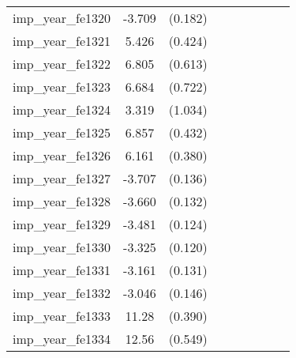 {\begin{tabular}{l*{4}{cc}}
imp\_year\_fe1320&   -3.709\sym{***}&  (0.182)&                  &         &                  &         &                  &         \\
imp\_year\_fe1321&    5.426\sym{***}&  (0.424)&                  &         &                  &         &                  &         \\
imp\_year\_fe1322&    6.805\sym{***}&  (0.613)&                  &         &                  &         &                  &         \\
imp\_year\_fe1323&    6.684\sym{***}&  (0.722)&                  &         &                  &         &                  &         \\
imp\_year\_fe1324&    3.319\sym{**} &  (1.034)&                  &         &                  &         &                  &         \\
imp\_year\_fe1325&    6.857\sym{***}&  (0.432)&                  &         &                  &         &                  &         \\
imp\_year\_fe1326&    6.161\sym{***}&  (0.380)&                  &         &                  &         &                  &         \\
imp\_year\_fe1327&   -3.707\sym{***}&  (0.136)&                  &         &                  &         &                  &         \\
imp\_year\_fe1328&   -3.660\sym{***}&  (0.132)&                  &         &                  &         &                  &         \\
imp\_year\_fe1329&   -3.481\sym{***}&  (0.124)&                  &         &                  &         &                  &         \\
imp\_year\_fe1330&   -3.325\sym{***}&  (0.120)&                  &         &                  &         &                  &         \\
imp\_year\_fe1331&   -3.161\sym{***}&  (0.131)&                  &         &                  &         &                  &         \\
imp\_year\_fe1332&   -3.046\sym{***}&  (0.146)&                  &         &                  &         &                  &         \\
imp\_year\_fe1333&    11.28\sym{***}&  (0.390)&                  &         &                  &         &                  &         \\
imp\_year\_fe1334&    12.56\sym{***}&  (0.549)&                  &         &                  &         &                  &         \\

\end{tabular}}
